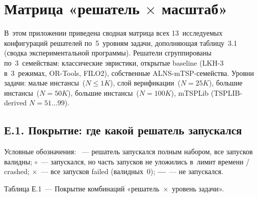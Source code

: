 \documentclass[a4paper,14pt]{extreport}
\begin{document}
\chapter{Матрица «решатель $\times$ масштаб»}
\label{ch:appendix-matrix}

В~этом приложении приведена сводная матрица всех 13~исследуемых конфигураций решателей по~5~уровням задачи, дополняющая таблицу~3.1 (сводка экспериментальной программы). Решатели сгруппированы по~3~семействам: классические эвристики, открытые baseline (LKH-3 в~3~режимах, OR-Tools, FILO2), собственные ALNS-mTSP-семейства. Уровни задачи: малые инстансы~($N \leq 1K$), слой верификации~($N=25K$), большие инстансы~($N=50K$), большие инстансы~($N=100K$), mTSPLib (TSPLIB-derived $N=51\dots99$).

\section*{Е.1. Покрытие: где какой решатель запускался}

Условные обозначения: \textbf{\checkmark}~--- решатель запускался полным набором, все запусков валидны; \textbf{$\circ$}~--- запускался, но часть запусков не уложились в~лимит времени / crashed; \textbf{$\times$}~--- все запусков failed (валидных~0); \textbf{---}~--- не запускался.

\medskip
\noindent Таблица Е.1~--- Покрытие комбинаций «решатель~$\times$~уровень задачи».
\end{document}
